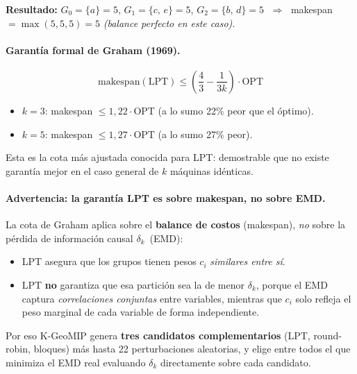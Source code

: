 \documentclass[12pt,letterpaper]{article}
\theoremstyle{definition}
\theoremstyle{remark}
\begin{document}
\textbf{Resultado:}
$G_0 = \{a\} = 5$,\quad
$G_1 = \{c,\, e\} = 5$,\quad
$G_2 = \{b,\, d\} = 5$
$\;\Rightarrow\;$ makespan $= \max(5,5,5) = 5$ \quad\emph{(balance perfecto en este caso)}.

\paragraph{Garantía formal de Graham (1969).}

\begin{blueBox}
\begin{equation}
  \mathrm{makespan}(\mathrm{LPT}) \leq
  \left(\frac{4}{3} - \frac{1}{3k}\right) \cdot \mathrm{OPT}
  \label{eq:lpt-garantia}
\end{equation}
\begin{itemize}
  \item $k=3$: makespan $\leq 1{,}22 \cdot \mathrm{OPT}$
    (a lo sumo 22\% peor que el óptimo).
  \item $k=5$: makespan $\leq 1{,}27 \cdot \mathrm{OPT}$
    (a lo sumo 27\% peor).
\end{itemize}
Esta es la cota más ajustada conocida para LPT: demostrable que no existe
garantía mejor en el caso general de $k$ máquinas idénticas.
\end{blueBox}

\paragraph{Advertencia: la garantía LPT es sobre makespan, no sobre EMD.}

\begin{orangeBox}
La cota de Graham aplica sobre el \textbf{balance de costos} (makespan),
\emph{no} sobre la pérdida de información causal $\delta_k$~(EMD):

\begin{itemize}
  \item LPT asegura que los grupos tienen pesos $c_i$ \emph{similares entre sí}.
  \item LPT \textbf{no} garantiza que esa partición sea la de menor $\delta_k$,
    porque el EMD captura \emph{correlaciones conjuntas} entre variables,
    mientras que $c_i$ solo refleja el peso marginal de cada variable de forma
    independiente.
\end{itemize}

\medskip
Por eso K-GeoMIP genera \textbf{tres candidatos complementarios}
(LPT, round-robin, bloques) más hasta 22 perturbaciones aleatorias,
y elige entre todos el que minimiza el EMD real evaluando $\delta_k$
directamente sobre cada candidato.
\end{orangeBox}
\end{document}
